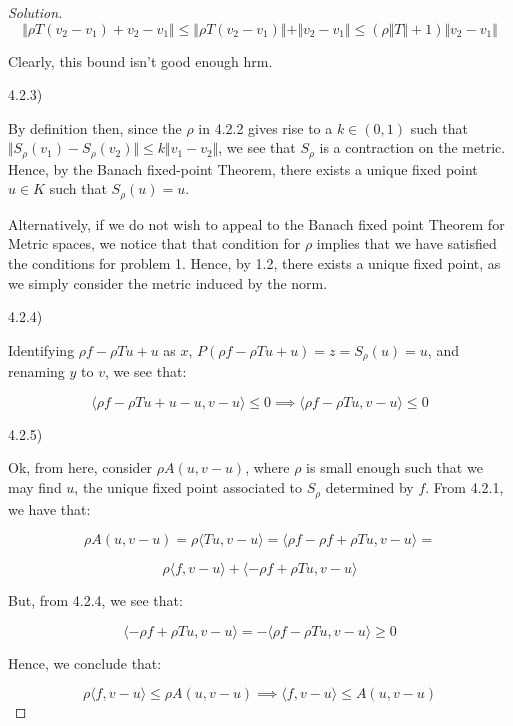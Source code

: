\documentclass[10pt]{article}
\begin{document}
\begin{proof}[Solution]
$$ \Vert \rho T(v_2 - v_1) + v_2 - v_1 \Vert \leq \Vert \rho T(v_2 - v_1) \Vert +  \Vert v_2 - v_1 \Vert \leq (\rho \Vert T \Vert + 1) \Vert v_2 - v_1 \Vert $$

Clearly, this bound isn't good enough hrm.

4.2.3)

By definition then, since the $\rho$ in 4.2.2 gives rise to a $k \in (0,1)$ such that $ \Vert  S_\rho(v_1) - S_\rho(v_2)  \Vert \leq k  \Vert v_1 - v_2 \Vert$, we see that $S_\rho$ is a contraction on the metric. Hence, by the Banach fixed-point Theorem, there exists a unique fixed point $u \in K$ such that $S_\rho(u) = u$.

Alternatively, if we do not wish to appeal to the Banach fixed point Theorem for Metric spaces, we notice that that condition for $\rho$ implies that we have satisfied the conditions for problem 1. Hence, by 1.2, there exists a unique fixed point, as we simply consider the metric induced by the norm.

4.2.4)

Identifying $ \rho f - \rho T u + u$ as $x$, $P( \rho f - \rho T u + u) = z = S_\rho(u) = u$, and renaming $y$ to $v$, we see that:

$$\langle \rho f - \rho Tu + u - u, v - u \rangle \leq 0 \implies \langle \rho f - \rho Tu, v - u \rangle \leq 0$$

4.2.5)

Ok, from here, consider $\rho A(u, v - u)$, where $\rho$ is small enough such that we may find $u$, the unique fixed point associated to $S_\rho$ determined by $f$. From 4.2.1, we have that:

$$ \rho A(u, v -u) = \rho \langle Tu, v - u \rangle = \langle \rho f - \rho f + \rho T u, v - u \rangle = $$

$$ \rho \langle f, v - u \rangle + \langle - \rho f + \rho Tu, v - u \rangle$$

But, from 4.2.4, we see that:

$$ \langle - \rho f + \rho Tu, v - u \rangle  = -  \langle \rho f - \rho Tu, v - u \rangle \geq 0 $$

Hence, we conclude that:

$$ \rho \langle f, v - u \rangle \leq \rho A(u, v - u) \implies \langle f, v - u \rangle \leq A(u, v - u) $$





\end{proof}
\end{document}
